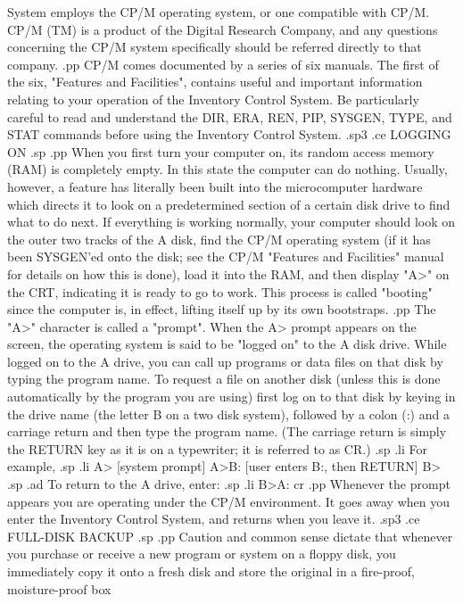 System
employs the CP/M operating system, or one compatible with CP/M.  CP/M (TM) is a
product of the Digital Research Company, and any questions concerning the
CP/M system specifically should be referred directly to that company.
.pp
CP/M comes documented by a series of six manuals.  The first of the six,
"Features and Facilities", contains useful and important information
relating to your operation of the Inventory Control System.  Be particularly
careful to read and understand the DIR, ERA, REN, PIP, SYSGEN, TYPE,
and STAT commands before using the Inventory Control System.
.sp3
.ce
LOGGING ON
.sp
.pp
When you first turn your computer on, its random access memory (RAM) is
completely empty.  In this state the computer can do nothing.
Usually, however,
a feature has literally been built into the microcomputer hardware which
directs it to look on a predetermined section of a certain disk drive to find
what to do next.  If everything is working normally, your computer should
look on the outer two tracks of the A disk, find the CP/M operating system
(if it has been SYSGEN'ed onto the disk; see the CP/M "Features and Facilities"
manual for details on how this is done), load it into the RAM, and then
display "A>" on the CRT, indicating it is ready to go to work.  This
process is called "booting" since the computer is, in effect, lifting itself
up by its own bootstraps.
.pp
The "A>" character is called a "prompt".  When the A> prompt appears on the
screen, the operating system is said to be "logged on" to the A disk drive.
While logged on to the A drive, you can call up programs or data files on that
disk by typing the program name.
To request a file on another disk (unless this is done automatically
by the program you are using) first log on to that disk by keying in
the drive name (the letter B on a two disk system), followed by a
colon (:) and a carriage return and then type the program name.
(The carriage return is simply the RETURN
key as it is on a typewriter; it is referred to as CR.)
.sp
.li
	For example,
.sp
.li
	   A>		   [system prompt]
	   A>B: 	   [user enters B:, then RETURN]
	   B>
.sp
.ad
To return to the A drive, enter:
.sp
.li
	   B>A: cr
.pp
Whenever the prompt appears you are operating under the CP/M
environment.  It goes away when you enter the Inventory Control System, and
returns when you leave it.
.sp3
.ce
FULL-DISK BACKUP
.sp
.pp
Caution and common sense dictate that whenever you purchase or receive a
new program or system  on a floppy disk, you immediately copy it
onto a fresh disk and store the original in a fire-proof, moisture-proof  box

